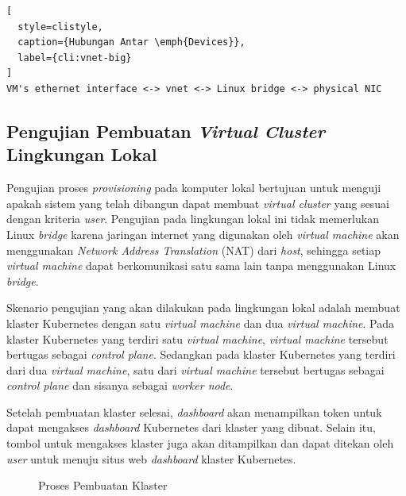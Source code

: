 \begin{lstlisting}[
  style=clistyle,
  caption={Hubungan Antar \emph{Devices}},
  label={cli:vnet-big}
]
VM's ethernet interface <-> vnet <-> Linux bridge <-> physical NIC
\end{lstlisting}

\subsection{Pengujian Pembuatan \emph{Virtual Cluster} Lingkungan Lokal}
\label{subsec:pengujian-pembuatan-vc}

Pengujian proses \emph{provisioning} pada komputer lokal bertujuan untuk
menguji apakah sistem yang telah dibangun dapat membuat \emph{virtual cluster}
yang sesuai dengan kriteria \emph{user}. Pengujian pada lingkungan lokal ini
tidak memerlukan Linux \emph{bridge} karena jaringan internet yang digunakan
oleh \emph{virtual machine} akan menggunakan \emph{Network Address Translation} (NAT)
dari \emph{host}, sehingga setiap \emph{virtual machine} dapat berkomunikasi satu sama
lain tanpa menggunakan Linux \emph{bridge}.

Skenario pengujian yang akan dilakukan pada lingkungan lokal adalah
membuat klaster Kubernetes dengan satu \emph{virtual machine} dan dua \emph{virtual machine}.
Pada klaster Kubernetes yang terdiri satu \emph{virtual machine}, \emph{virtual machine}
tersebut bertugas sebagai \emph{control plane}. Sedangkan pada klaster Kubernetes yang terdiri
dari dua \emph{virtual machine}, satu dari \emph{virtual machine} tersebut bertugas sebagai
\emph{control plane} dan sisanya sebagai \emph{worker node}.

Setelah pembuatan klaster selesai, \emph{dashboard} akan menampilkan
token untuk dapat mengakses \emph{dashboard} Kubernetes dari klaster
yang dibuat. Selain itu, tombol untuk mengakses klaster juga akan ditampilkan
dan dapat ditekan oleh \emph{user} untuk menuju situs web \emph{dashboard}
klaster Kubernetes.

\begin{figure}[H]
  \centering
  \caption{Proses Pembuatan Klaster}
  \label{fig:proses-pembuatan-klaster}
\end{figure}

